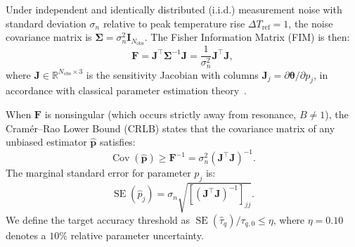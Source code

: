 \documentclass[preprint,12pt]{elsarticle}
\begin{document}
Under independent and identically distributed (i.i.d.) measurement noise with standard deviation $\sigma_n$ relative to peak temperature rise $\Delta T_{\mathrm{ref}} = 1$, the noise covariance matrix is $\bm{\Sigma} = \sigma_n^2 \bm{I}_{N_{\mathrm{obs}}}$. The Fisher Information Matrix (FIM) is then:
\begin{equation}
\bm{F} = \bm{J}^\top \bm{\Sigma}^{-1} \bm{J} = \frac{1}{\sigma_n^2} \bm{J}^\top \bm{J},
\label{eq:fim_def}
\end{equation}
where $\bm{J} \in \mathbb{R}^{N_{\mathrm{obs}} \times 3}$ is the sensitivity Jacobian with columns $\bm{J}_j = \partial \bm{\theta} / \partial p_j$, in accordance with classical parameter estimation theory~\cite{beck1977parameter,fadale1995two,dowding1995estimation,walter1997identification}.

When $\bm{F}$ is nonsingular (which occurs strictly away from resonance, $B \ne 1$), the Cramér--Rao Lower Bound (CRLB) states that the covariance matrix of any unbiased estimator $\hat{\bm{p}}$ satisfies:
\begin{equation}
\operatorname{Cov}(\hat{\bm{p}}) \ge \bm{F}^{-1} = \sigma_n^2 (\bm{J}^\top \bm{J})^{-1}.
\label{eq:crlb_def}
\end{equation}
The marginal standard error for parameter $p_j$ is:
\begin{equation}
\operatorname{SE}(\hat{p}_j) = \sigma_n \sqrt{[(\bm{J}^\top \bm{J})^{-1}]_{jj}}.
\label{eq:se_pj_def}
\end{equation}
We define the target accuracy threshold as $\operatorname{SE}(\hat{\tau}_q) / \tau_{q,0} \le \eta$, where $\eta = 0.10$ denotes a $10\%$ relative parameter uncertainty.
\end{document}
